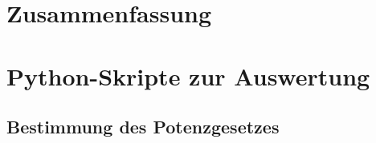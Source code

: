 \documentclass[11pt,a4paper,oneside]{scrartcl}
\begin{document}
\section{Zusammenfassung}
\newpage

 

\appendix



\section{Python-Skripte zur Auswertung}
\subsection{Bestimmung des Potenzgesetzes}
%
\end{document}
